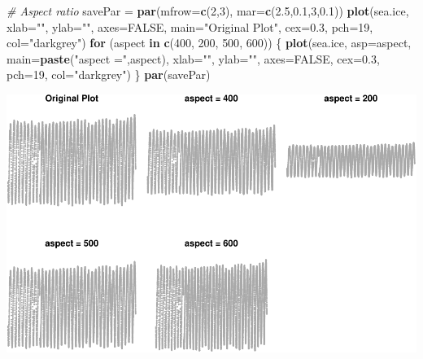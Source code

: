 \documentclass[9pt,letter]{article}
\newenvironment{Shaded}{\begin{snugshade}}{\end{snugshade}}
\newcommand{\KeywordTok}[1]{\textcolor[rgb]{0.13,0.29,0.53}{\textbf{#1}}}
\newcommand{\DataTypeTok}[1]{\textcolor[rgb]{0.13,0.29,0.53}{#1}}
\newcommand{\DecValTok}[1]{\textcolor[rgb]{0.00,0.00,0.81}{#1}}
\newcommand{\FloatTok}[1]{\textcolor[rgb]{0.00,0.00,0.81}{#1}}
\newcommand{\StringTok}[1]{\textcolor[rgb]{0.31,0.60,0.02}{#1}}
\newcommand{\CommentTok}[1]{\textcolor[rgb]{0.56,0.35,0.01}{\textit{#1}}}
\newcommand{\OtherTok}[1]{\textcolor[rgb]{0.56,0.35,0.01}{#1}}
\newcommand{\ControlFlowTok}[1]{\textcolor[rgb]{0.13,0.29,0.53}{\textbf{#1}}}
\newcommand{\NormalTok}[1]{#1}
\begin{document}
\begin{Shaded}
\begin{Highlighting}[]
\CommentTok{# Aspect ratio}
\NormalTok{savePar =}\StringTok{ }\KeywordTok{par}\NormalTok{(}\DataTypeTok{mfrow=}\KeywordTok{c}\NormalTok{(}\DecValTok{2}\NormalTok{,}\DecValTok{3}\NormalTok{), }\DataTypeTok{mar=}\KeywordTok{c}\NormalTok{(}\FloatTok{2.5}\NormalTok{,}\FloatTok{0.1}\NormalTok{,}\DecValTok{3}\NormalTok{,}\FloatTok{0.1}\NormalTok{))}
\KeywordTok{plot}\NormalTok{(sea.ice, }\DataTypeTok{xlab=}\StringTok{""}\NormalTok{, }\DataTypeTok{ylab=}\StringTok{""}\NormalTok{, }\DataTypeTok{axes=}\OtherTok{FALSE}\NormalTok{,}
     \DataTypeTok{main=}\StringTok{"Original Plot"}\NormalTok{, }\DataTypeTok{cex=}\FloatTok{0.3}\NormalTok{, }\DataTypeTok{pch=}\DecValTok{19}\NormalTok{, }\DataTypeTok{col=}\StringTok{"darkgrey"}\NormalTok{)}
\ControlFlowTok{for}\NormalTok{ (aspect }\ControlFlowTok{in} \KeywordTok{c}\NormalTok{(}\DecValTok{400}\NormalTok{, }\DecValTok{200}\NormalTok{, }\DecValTok{500}\NormalTok{, }\DecValTok{600}\NormalTok{)) \{}
  \KeywordTok{plot}\NormalTok{(sea.ice, }\DataTypeTok{asp=}\NormalTok{aspect,}
       \DataTypeTok{main=}\KeywordTok{paste}\NormalTok{(}\StringTok{"aspect ="}\NormalTok{,aspect),}
       \DataTypeTok{xlab=}\StringTok{""}\NormalTok{, }\DataTypeTok{ylab=}\StringTok{""}\NormalTok{, }\DataTypeTok{axes=}\OtherTok{FALSE}\NormalTok{,}
       \DataTypeTok{cex=}\FloatTok{0.3}\NormalTok{, }\DataTypeTok{pch=}\DecValTok{19}\NormalTok{, }\DataTypeTok{col=}\StringTok{"darkgrey"}\NormalTok{)}
\NormalTok{\}}
\KeywordTok{par}\NormalTok{(savePar)}
\end{Highlighting}
\end{Shaded}

\includegraphics{a4_q3_files/figure-latex/unnamed-chunk-3-1.pdf}
\end{document}
